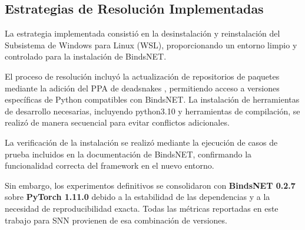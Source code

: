 \subsection{Estrategias de Resolución Implementadas}

La estrategia implementada consistió en la desinstalación y reinstalación del Subsistema de Windows para Linux (WSL), proporcionando un entorno limpio y controlado para la instalación de BindsNET.

El proceso de resolución incluyó la actualización de repositorios de paquetes mediante la adición del PPA de deadsnakes \cite{deadsnakes2025}, permitiendo acceso a versiones específicas de Python compatibles con BindsNET. La instalación de herramientas de desarrollo necesarias, incluyendo python3.10 y herramientas de compilación, se realizó de manera secuencial para evitar conflictos adicionales.

La verificación de la instalación se realizó mediante la ejecución de casos de prueba incluidos en la documentación de BindsNET, confirmando la funcionalidad correcta del framework en el nuevo entorno.

Sin embargo, los experimentos definitivos se consolidaron con \textbf{BindsNET 0.2.7} sobre \textbf{PyTorch 1.11.0} debido a la estabilidad de las dependencias y a la necesidad de reproducibilidad exacta. Todas las métricas reportadas en este trabajo para SNN provienen de esa combinación de versiones.